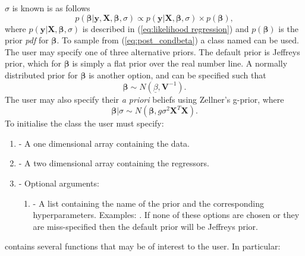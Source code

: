 \documentclass[article]{jss}
\begin{document}
$\sigma$ is known is as follows
\begin{equation} 
p\left(\bm{\beta}|\bm{y},\bm{X},\bm{\beta},\sigma\right)\propto
  p(\bm{y}|\bm{X},\bm{\beta},\sigma)\times
  p(\bm{\beta}),\label{eq:post_condbeta}
\end{equation} where
$p(\bm{y}|\bm{X},\bm{\beta},\sigma)$ is described in
(\ref{eq:likelihood regression}) and $p(\bm{\beta})$ is the prior
\emph{pdf} for $\bm{\beta}.$ To sample from (\ref{eq:post_condbeta}) a
class named  can be used. The user may
specify one of three alternative priors.  The default prior is
Jeffreys prior, which for $\bm{\beta}$ is simply a flat prior over
the real number line. A normally distributed prior for $\bm{\beta}$ is
another option, and can be specified such that\[ \bm{\beta}\sim
N\left(\underline{\beta},\bm{V}^{-1}\right).\] The user may also
specify their \emph{a priori} beliefs using Zellner's g-prior, where\[
\bm{\beta}|\sigma\sim
N\left(\bm{\beta},g\sigma^{2}\bm{X}^{T}\bm{X}\right).\] To initialise
the class the user must specify:
\begin{enumerate}
\item {} - A one dimensional  array containing the
  data.
\item {} - A two dimensional  array containing the
  regressors.
\item {} - Optional arguments:

\begin{enumerate}
\item {} - A list containing the name of the prior and the
  corresponding hyperparameters. Examples: . If none of
  these options are chosen or they are miss-specified then the default
  prior will be Jeffreys prior.
\end{enumerate}
\end{enumerate}
 contains several functions that may be of
interest to the user. In particular:
\end{document}
